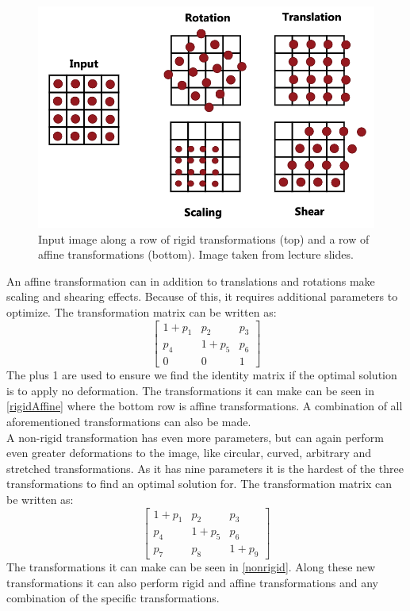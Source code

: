\begin{figure}[h]
	\centering
	\includegraphics[width=0.75\linewidth]{Materials/affineRigid}
	\caption{Input image along a row of rigid transformations (top) and a row of affine transformations (bottom). Image taken from lecture slides.}
	\label{rigidAffine}
\end{figure}
An affine transformation can in addition to translations and rotations make scaling and shearing effects. Because of this, it requires additional parameters to optimize. The transformation matrix can be written as:
\begin{equation*}
	\begin{bmatrix}
		1+p_1 & p_2 & p_3\\
		p_4  &  1+p_5 & p_6\\
		0				 & 0				 & 1
	\end{bmatrix}
\end{equation*}
The plus 1 are used to ensure we find the identity matrix if the optimal solution is to apply no deformation. The transformations it can make can be seen in \autoref{rigidAffine} where the bottom row is affine transformations. A combination of all aforementioned transformations can also be made.\\
A non-rigid transformation has even more parameters, but can again perform even greater deformations to the image, like circular, curved, arbitrary and stretched transformations. As it has nine parameters it is the hardest of the three transformations to find an optimal solution for. The transformation matrix can be written as:
\begin{equation*}
	\begin{bmatrix}
		1+p_1 & p_2 & p_3\\
		p_4  &  1+p_5 & p_6\\
		p_7	 & p_8	& 1+p_9
	\end{bmatrix}
\end{equation*}
The transformations it can make can be seen in \autoref{nonrigid}. Along these new transformations it can also perform rigid and affine transformations and any combination of the specific transformations. 

